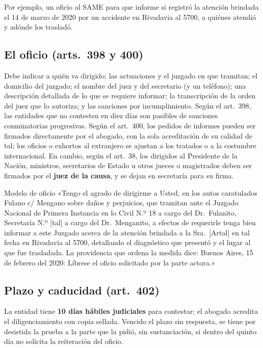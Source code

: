 \documentclass[12pt,oneside]{book}
\begin{document}
Por ejemplo, un oficio al SAME para que informe si registró la atención brindada el 14 de marzo de 2020 por un accidente en Rivadavia al 5700, a quiénes atendió y adónde los trasladó.

\subsection{El oficio (arts.~398 y 400)}

Debe indicar a quién va dirigido; las actuaciones y el juzgado en que tramitan; el domicilio del juzgado; el nombre del juez y del secretario (y un teléfono); una descripción detallada de lo que se requiere informar; la transcripción de la orden del juez que lo autoriza; y las sanciones por incumplimiento. Según el art.~398, las entidades que no contesten en diez días son pasibles de sanciones conminatorias progresivas. Según el art.~400, los pedidos de informes pueden ser firmados directamente por el abogado, con la sola acreditación de su calidad de tal; los oficios o exhortos al extranjero se ajustan a los tratados o a la costumbre internacional. En cambio, según el art.~38, los dirigidos al Presidente de la Nación, ministros, secretarios de Estado u otros jueces o magistrados deben ser firmados por el \textbf{juez de la causa}, y se dejan en secretaría para su firma.

\begin{example}{Modelo de oficio}
«Tengo el agrado de dirigirme a Usted, en los autos caratulados Fulano c/ Mengano sobre daños y perjuicios, que tramitan ante el Juzgado Nacional de Primera Instancia en lo Civil N.º 18 a cargo del Dr.\ Fulanito, Secretaría N.º [tal] a cargo del Dr.\ Menganito, a efectos de requerirle tenga bien informar a este Juzgado acerca de la atención brindada a la Sra.\ [Artal] en tal fecha en Rivadavia al 5700, detallando el diagnóstico que presentó y el lugar al que fue trasladada. La providencia que ordena la medida dice: Buenos Aires, 15 de febrero del 2020: Líbrese el oficio solicitado por la parte actora.»
\end{example}

\subsection{Plazo y caducidad (art.~402)}

La entidad tiene \textbf{10 días hábiles judiciales} para contestar; el abogado acredita el diligenciamiento con copia sellada. %
Vencido el plazo sin respuesta, se tiene por desistida la prueba a la parte que la pidió, sin sustanciación, si dentro del quinto día no solicita la reiteración del oficio.
\end{document}
